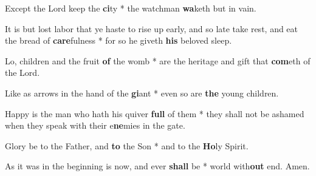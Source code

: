 \begin{multicols}{2}
	Except the Lord keep the \textbf{ci}ty * the watchman \textbf{wa}keth but in vain.

	It is but lost labor that ye haste to rise up early, and so late take rest, and eat the bread of \textbf{care}fulness * for so he giveth \textbf{his} beloved sleep.
	
	Lo, children and the fruit \textbf{of} the womb * are the heritage and gift that \textbf{com}eth of the Lord.
	
	Like as arrows in the hand of the \textbf{gi}ant * even so are \textbf{the} young children.
	
	Happy is the man who hath his quiver \textbf{full} of them * they shall not be ashamed when they speak with their e\textbf{ne}mies in the gate.
	
	Glory be to the Father, and \textbf{to} the Son * and to the \textbf{Ho}ly Spirit.
	
	As it was in the beginning is now, and ever \textbf{shall} be * world with\textbf{out} end. Amen.
\end{multicols}